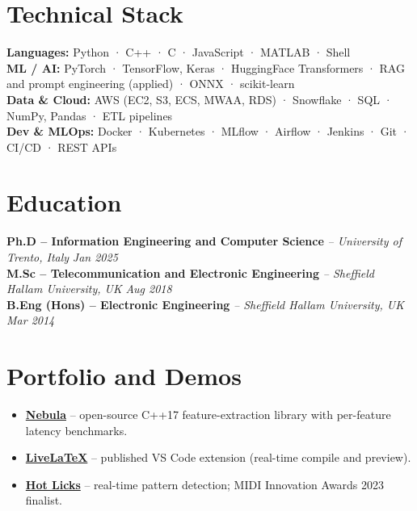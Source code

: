 \documentclass[11pt]{article}
\begin{document}
\section*{Technical Stack}

\textbf{Languages:} Python · C++ · C · JavaScript · MATLAB · Shell\\
\textbf{ML / AI:} PyTorch · TensorFlow, Keras · HuggingFace Transformers · RAG and prompt engineering (applied) · ONNX · scikit-learn\\
\textbf{Data \& Cloud:} AWS (EC2, S3, ECS, MWAA, RDS) · Snowflake · SQL · NumPy, Pandas · ETL pipelines\\
\textbf{Dev \& MLOps:} Docker · Kubernetes · MLflow · Airflow · Jenkins · Git · CI/CD · REST APIs

\section*{Education}
\textbf{Ph.D -- Information Engineering and Computer Science} \textit{\small{ -- University of Trento, Italy}} \hfill \textit{Jan 2025}\\[2pt]
\noindent\textbf{M.Sc -- Telecommunication and Electronic Engineering} \textit{\small{ -- Sheffield Hallam University, UK}} \hfill \textit{Aug 2018}\\[2pt]
\noindent\textbf{B.Eng (Hons) -- Electronic Engineering} \textit{\small{ -- Sheffield Hallam University, UK}} \hfill \textit{Mar 2014}

\section*{Portfolio and Demos \footnotesize {}}
\begin{itemize}[leftmargin=1.2em, itemsep=-0.25em]
    \item \href{https://github.com/ns2max/nebula}{\textbf{Nebula}} -- open-source C++17 feature-extraction library with per-feature latency benchmarks.
    \item \href{https://marketplace.visualstudio.com/items?itemName=ns2max.livelatex}{\textbf{LiveLaTeX}} -- published VS Code extension (real-time compile and preview).
    \item \href{https://youtu.be/gkOqfOT8zXM}{\textbf{Hot Licks}} -- real-time pattern detection; MIDI Innovation Awards 2023 finalist.
\end{itemize}
\end{document}
